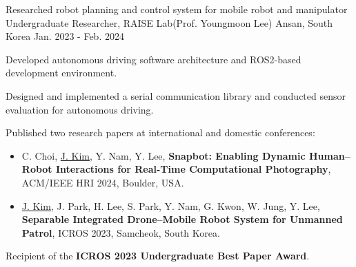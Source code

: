 \begin{cventries}
  \cventry
  {Researched robot planning and control system for mobile robot and manipulator} %
  {Undergraduate Researcher, RAISE Lab(Prof. Youngmoon Lee)} %
  {Ansan, South Korea} %
  {Jan. 2023 - Feb. 2024} %
  {
    \begin{cvitems}
      \item {Developed autonomous driving software architecture and ROS2-based development environment.}
      \item {Designed and implemented a serial communication library and conducted sensor evaluation for autonomous driving.}
      \item {Published two research papers at international and domestic conferences:}
      \begin{itemize}
        \item {C. Choi, \underline{J. Kim}, Y. Nam, Y. Lee, \textbf{Snapbot: Enabling Dynamic Human–Robot Interactions for Real-Time Computational Photography}, ACM/IEEE HRI 2024, Boulder, USA.}
        \item {\underline{J. Kim}, J. Park, H. Lee, S. Park, Y. Nam, G. Kwon, W. Jung, Y. Lee, \textbf{Separable Integrated Drone–Mobile Robot System for Unmanned Patrol}, ICROS 2023, Samcheok, South Korea.}
      \end{itemize}
      \item {Recipient of the \textbf{ICROS 2023 Undergraduate Best Paper Award}.}
    \end{cvitems}
  }

\end{cventries}
